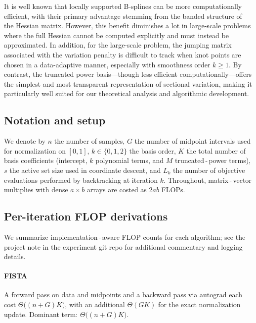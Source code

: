 \begin{remark}
\label{rem:comp_comparison}
It is well known that locally supported B-splines can be more computationally efficient, with their primary advantage stemming from the banded structure of the Hessian matrix. However, this benefit diminishes a lot in large-scale problems where the full Hessian cannot be computed explicitly and must instead be approximated. In addition, for the large-scale problem, the jumping matrix associated with the variation penalty is difficult to track when knot points are chosen in a data-adaptive manner, especially with smoothness order $k \geq 1$. By contrast, the truncated power basis---though less efficient computationally---offers the simplest and most transparent representation of sectional variation, making it particularly well suited for our theoretical analysis and algorithmic development.
\end{remark}

\subsection{Notation and setup}
We denote by $n$ the number of samples, $G$ the number of midpoint intervals used for normalization on $[0,1]$, $k \in \{0,1,2\}$ the basis order, $K$ the total number of basis coefficients (intercept, $k$ polynomial terms, and $M$ truncated\,-\,power terms), $s$ the active set size used in coordinate descent, and $L_k$ the number of objective evaluations performed by backtracking at iteration $k$. Throughout, matrix\,-\,vector multiplies with dense $a\times b$ arrays are costed as $2ab$ FLOPs.

\subsection{Per-iteration FLOP derivations}
We summarize implementation\,-\,aware FLOP counts for each algorithm; see the project note  in the experiment git repo for additional commentary and logging details.

\paragraph{FISTA} A forward pass on data and midpoints and a backward pass via autograd each cost $\Theta\big((n+G)K\big)$, with an additional $\Theta(GK)$ for the exact normalization update. Dominant term: $\Theta\big((n+G)K\big)$.

